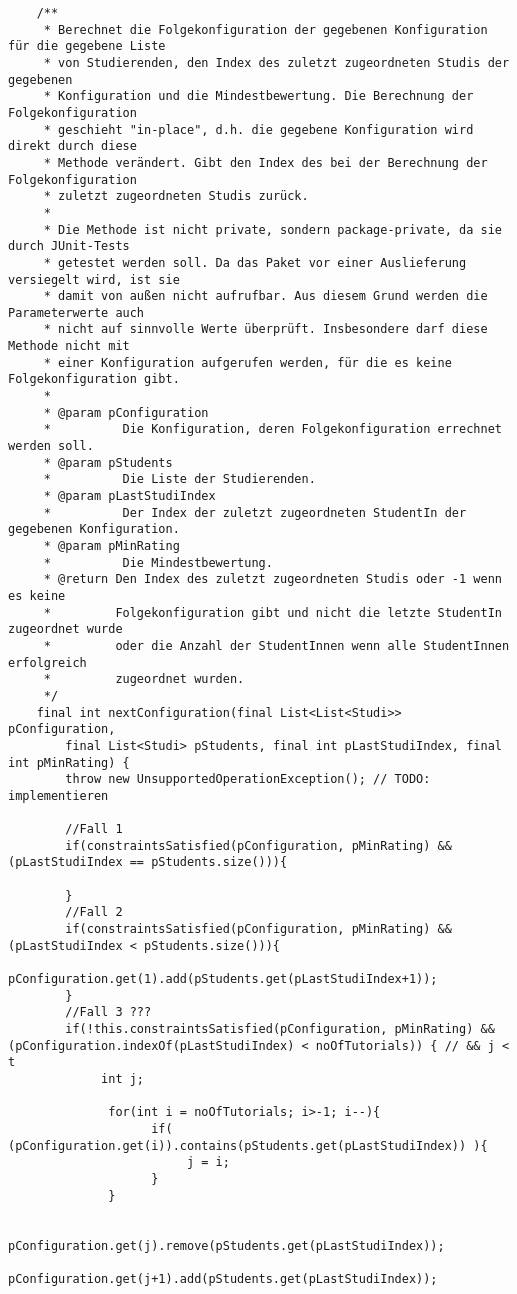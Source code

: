 \documentclass{pi2}
\begin{document}
\begin{lstlisting}
	/**
	 * Berechnet die Folgekonfiguration der gegebenen Konfiguration für die gegebene Liste
	 * von Studierenden, den Index des zuletzt zugeordneten Studis der gegebenen
	 * Konfiguration und die Mindestbewertung. Die Berechnung der Folgekonfiguration
	 * geschieht "in-place", d.h. die gegebene Konfiguration wird direkt durch diese
	 * Methode verändert. Gibt den Index des bei der Berechnung der Folgekonfiguration
	 * zuletzt zugeordneten Studis zurück.
	 *
	 * Die Methode ist nicht private, sondern package-private, da sie durch JUnit-Tests
	 * getestet werden soll. Da das Paket vor einer Auslieferung versiegelt wird, ist sie
	 * damit von außen nicht aufrufbar. Aus diesem Grund werden die Parameterwerte auch
	 * nicht auf sinnvolle Werte überprüft. Insbesondere darf diese Methode nicht mit
	 * einer Konfiguration aufgerufen werden, für die es keine Folgekonfiguration gibt.
	 *
	 * @param pConfiguration
	 *          Die Konfiguration, deren Folgekonfiguration errechnet werden soll.
	 * @param pStudents
	 *          Die Liste der Studierenden.
	 * @param pLastStudiIndex
	 *          Der Index der zuletzt zugeordneten StudentIn der gegebenen Konfiguration.
	 * @param pMinRating
	 *          Die Mindestbewertung.
	 * @return Den Index des zuletzt zugeordneten Studis oder -1 wenn es keine
	 *         Folgekonfiguration gibt und nicht die letzte StudentIn zugeordnet wurde
	 *         oder die Anzahl der StudentInnen wenn alle StudentInnen erfolgreich
	 *         zugeordnet wurden.
	 */
	final int nextConfiguration(final List<List<Studi>> pConfiguration,
		final List<Studi> pStudents, final int pLastStudiIndex, final int pMinRating) {
		throw new UnsupportedOperationException(); // TODO: implementieren
		
		//Fall 1
		if(constraintsSatisfied(pConfiguration, pMinRating) && (pLastStudiIndex == pStudents.size())){
			
		}
		//Fall 2
		if(constraintsSatisfied(pConfiguration, pMinRating) && (pLastStudiIndex < pStudents.size())){
			pConfiguration.get(1).add(pStudents.get(pLastStudiIndex+1));
		}
		//Fall 3 ???
		if(!this.constraintsSatisfied(pConfiguration, pMinRating) && (pConfiguration.indexOf(pLastStudiIndex) < noOfTutorials)) { // && j < t 
	         int j;
	          
	          for(int i = noOfTutorials; i>-1; i--){
					if( (pConfiguration.get(i)).contains(pStudents.get(pLastStudiIndex)) ){
						 j = i;
					}
	          }
	          
			 pConfiguration.get(j).remove(pStudents.get(pLastStudiIndex));
			 pConfiguration.get(j+1).add(pStudents.get(pLastStudiIndex));
			 

\end{lstlisting}
\end{document}
